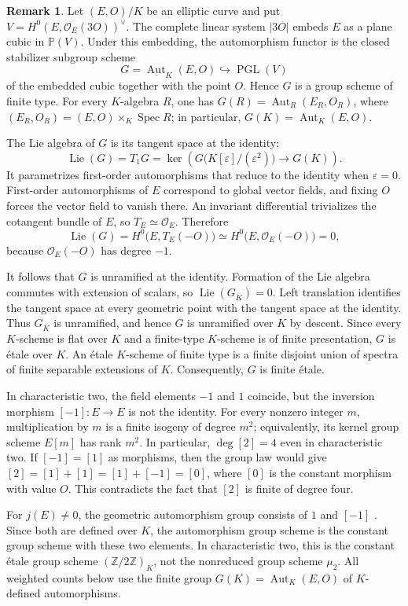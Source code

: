 \documentclass[a4paper,12pt]{amsart}
\theoremstyle{definition}
\newtheorem{rmk}[thm]{Remark}
\newcommand{\Zb}{\mathbb{Z}}
\newcommand{\Pb}{\mathbb{P}}
\DeclareMathOperator{\Spec}{Spec}
\newcommand{\Aut}{\operatorname{Aut}}
\begin{document}
\begin{rmk}
\label{rmk:etale-aut}
Let $(E,O)/K$ be an elliptic curve and put $V=H^0(E,\mathcal O_E(3O))^\vee$.  The complete linear system $|3O|$ embeds $E$ as a plane cubic in $\Pb(V)$.  Under this embedding, the automorphism functor is the closed stabilizer subgroup scheme
\[
G=\underline{\Aut}_K(E,O)
\hookrightarrow
\operatorname{PGL}(V)
\]
of the embedded cubic together with the point $O$.  Hence $G$ is a group scheme of finite type.  For every $K$-algebra $R$, one has $G(R)=\Aut_R(E_R,O_R)$, where $(E_R,O_R)=(E,O)\times_K\Spec R$; in particular, $G(K)=\Aut_K(E,O)$.

The Lie algebra of $G$ is its tangent space at the identity:
\[
\operatorname{Lie}(G)
=T_1G
=
\ker\left(
G\bigl(K[\varepsilon]/(\varepsilon^2)\bigr)
\longrightarrow
G(K)
\right).
\]
It parametrizes first-order automorphisms that reduce to the identity when $\varepsilon=0$.  First-order automorphisms of $E$ correspond to global vector fields, and fixing $O$ forces the vector field to vanish there. An invariant differential trivializes the cotangent bundle of $E$, so $T_E\simeq\mathcal O_E$.  Therefore
\[
\operatorname{Lie}(G)
=H^0\bigl(E,T_E(-O)\bigr)
\simeq
H^0\bigl(E,\mathcal O_E(-O)\bigr)
=0,
\]
because $\mathcal O_E(-O)$ has degree $-1$.

It follows that $G$ is unramified at the identity.  Formation of the Lie algebra commutes with extension of scalars, so $\operatorname{Lie}(G_{\overline K})=0$.  Left translation identifies the tangent space at every geometric point with the tangent space at the identity.  Thus $G_{\overline K}$ is unramified, and hence $G$ is unramified over $K$ by descent.  Since every $K$-scheme is flat over $K$ and a finite-type $K$-scheme is of finite presentation, $G$ is \'etale over $K$.  An \'etale $K$-scheme of finite type is a finite disjoint union of spectra of finite separable extensions of $K$.  Consequently, $G$ is finite \'etale.

In characteristic two, the field elements $-1$ and $1$ coincide, but the inversion morphism $[-1]\colon E\to E$ is not the identity.  For every nonzero integer $m$, multiplication by $m$ is a finite isogeny of degree $m^2$; equivalently, its kernel group scheme $E[m]$ has rank $m^2$.  In particular, $\deg[2]=4$ even in characteristic two.  If $[-1]=[1]$ as morphisms, then the group law would give $[2]=[1]+[1]=[1]+[-1]=[0]$, where $[0]$ is the constant morphism with value $O$.  This contradicts the fact that $[2]$ is finite of degree four.

For $j(E)\neq0$, the geometric automorphism group consists of $1$ and $[-1]$ \cite[Appendix~A, Proposition~1.2(c)]{Silverman}.  Since both are defined over $K$, the automorphism group scheme is the constant group scheme with these two elements.  In characteristic two, this is the constant \'etale group scheme $(\Zb/2\Zb)_K$, not the nonreduced group scheme $\mu_2$.  All weighted counts below use the finite group $G(K)=\Aut_K(E,O)$ of $K$-defined automorphisms.
\end{rmk}
\end{document}
